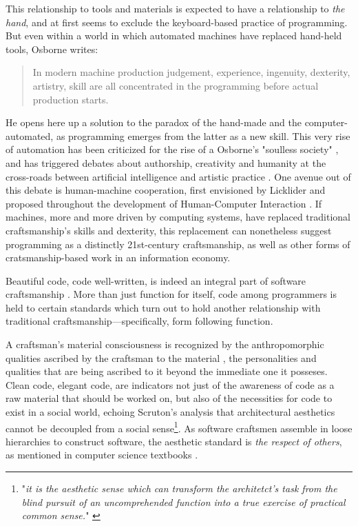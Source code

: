 This relationship to tools and materials is expected to have a relationship to \emph{the hand}, and at first seems to exclude the keyboard-based practice of programming. But even within a world in which automated machines have replaced hand-held tools, Osborne writes:

\begin{quote}
    In modern machine production judgement, experience, ingenuity, dexterity, artistry, skill are all concentrated in the programming before actual production starts. \citep{osborne_aesthetic_1977}
\end{quote}

He opens here up a solution to the paradox of the hand-made and the computer-automated, as programming emerges from the latter as a new skill. This very rise of automation has been criticized for the rise of a Osborne's "soulless society" \citep{osborne_aesthetic_1977}, and has triggered debates about authorship, creativity and humanity at the cross-roads between artificial intelligence and artistic practice \citep{mazzone_art_2019}. One avenue out of this debate is human-machine cooperation, first envisioned by Licklider and proposed throughout the development of Human-Computer Interaction \citep{licklider_mancomputer_1960,grudin_tool_2016}. If machines, more and more driven by computing systems, have replaced traditional craftsmanship's skills and dexterity, this replacement can nonetheless suggest programming as a distinctly 21st-century craftsmanship, as well as other forms of cratsmanship-based work in an information economy.

Beautiful code, code well-written, is indeed an integral part of software craftsmanship \citep{oram_beautiful_2007}. More than just function for itself, code among programmers is held to certain standards which turn out to hold another relationship with traditional craftsmanship—specifically, form following function.

A craftsman's material consciousness is recognized by the anthropomorphic qualities ascribed by the craftsman to the material \citep{sennett_craftsman_2009}, the personalities and qualities that are being ascribed to it beyond the immediate one it posseses. Clean code, elegant code, are indicators not just of the awareness of code as a raw material that should be worked on, but also of the necessities for code to exist in a social world, echoing Scruton's analysis that architectural aesthetics cannot be decoupled from a social sense\footnote{"\emph{it is the aesthetic sense which can transform the architetct's task from the blind pursuit of an uncomprehended function into a true exercise of practical common sense.}" \citep{scruton_aesthetics_2013}}. As software craftsmen assemble in loose hierarchies to construct software, the aesthetic standard is \emph{the respect of others}, as mentioned in computer science textbooks \citep{abelson_structure_1979}.


